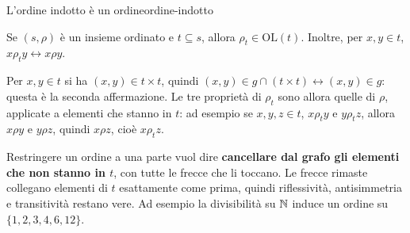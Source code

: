 
\begin{concetto}
\begin{Proposizione}{L'ordine indotto è un ordine}{ordine-indotto}
    \begin{prerequisiti}
    \end{prerequisiti}
    Se $(s, \rho)$ è un insieme ordinato e $t \subseteq s$, allora $\rho_t \in \mathrm{OL}(t)$. Inoltre, per $x, y \in t$, $x \rho_t y \leftrightarrow x \rho y$.
\end{Proposizione}
\begin{dimostrazione}
    Per $x, y \in t$ si ha $(x, y) \in t \times t$, quindi $(x, y) \in g \cap (t \times t) \leftrightarrow (x, y) \in g$: questa è la seconda
    affermazione. Le tre proprietà di $\rho_t$ sono allora quelle di $\rho$, applicate a elementi che stanno in $t$: ad esempio se
    $x, y, z \in t$, $x \rho_t y$ e $y \rho_t z$, allora $x \rho y$ e $y \rho z$, quindi $x \rho z$, cioè $x \rho_t z$.
\end{dimostrazione}
\end{concetto}

\begin{spiegazione}
    Restringere un ordine a una parte vuol dire \textbf{cancellare dal grafo gli elementi che non stanno in $t$}, con tutte le
    frecce che li toccano. Le frecce rimaste collegano elementi di $t$ esattamente come prima, quindi riflessività, antisimmetria
    e transitività restano vere. Ad esempio la divisibilità su $\mathbb{N}$ induce un ordine su $\{1, 2, 3, 4, 6, 12\}$.
\end{spiegazione}

